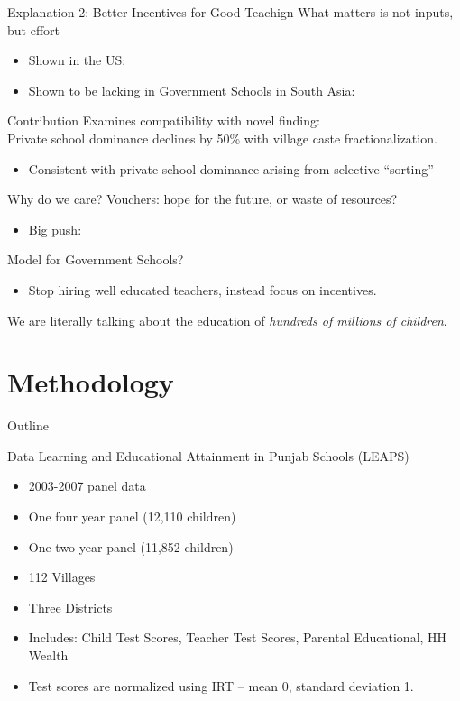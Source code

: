 \documentclass[handout]{beamer}
\begin{document}
\begin{frame}{Explanation 2: Better Incentives for Good Teachign}
What matters is not inputs, but effort
	\begin{itemize}
		\item Shown in the US: \cite{Hanushek:1997tt,Hanushek:2003hz,Banerjee:2007wx}
		\item Shown to be lacking in Government Schools in South Asia: \\
		\citep{Muralidharan:2008tb, Chaudhury:2006vp}
	\end{itemize}
\end{frame}

\begin{frame}{Contribution}
	Examines compatibility with novel finding: \\
	Private school dominance declines by 50\% with village caste fractionalization.
	\pause
	\begin{itemize}
		\item Consistent with private school dominance arising from selective ``sorting''
	\end{itemize}
\end{frame}

\begin{frame}{Why do we care?}
Vouchers: hope for the future, or waste of resources?
\begin{itemize}
	\item Big push: \citep{Chakrabarti:2008vc, Kelkar:2006tq, Panagariya:2008wi}
\end{itemize}
\pause
Model for Government Schools?
\begin{itemize}
	\item Stop hiring well educated teachers, instead focus on incentives.
\end{itemize}
\pause
We are literally talking about the education of \emph{hundreds of millions of children}.
\end{frame}


\section{Methodology}\label{}
\begin{frame}{Outline}
	\tableofcontents[currentsection]
\end{frame}

\begin{frame}{Data}	
Learning and Educational Attainment in Punjab Schools (LEAPS)
\begin{itemize}
	\item 2003-2007 panel data
	\item One four year panel (12,110 children)
	\item One two year panel (11,852 children)
	\item 112 Villages
	\item Three Districts
	\item Includes: Child Test Scores, Teacher Test Scores, Parental Educational, HH Wealth
	\item Test scores are normalized using IRT -- mean 0, standard deviation 1.
\end{itemize}
\end{frame}
\end{document}
